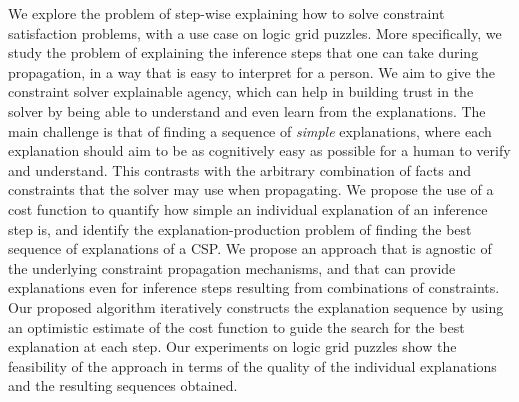 We explore the problem of step-wise explaining how to solve constraint satisfaction problems, with a use case on logic grid puzzles. More specifically, we study the problem of explaining the inference steps that one can take during propagation, in a way that is easy to interpret for a person. We aim to give the constraint solver explainable agency, which can help in building trust in the solver by being able to understand and even learn from the explanations.
The main challenge is that of finding a sequence of \textit{simple} explanations, where each explanation should aim to be as cognitively easy as possible for a human to verify and understand. 
This contrasts with the arbitrary combination of facts and constraints that the solver may use when propagating. %
We propose the use of a cost function to quantify how simple an individual explanation of an inference step is, and identify the explanation-production problem of finding the best sequence of explanations of a CSP. 
We propose an approach that is agnostic of the underlying constraint propagation mechanisms, and that can provide explanations even for inference steps resulting from combinations of constraints.
Our proposed algorithm iteratively constructs the explanation sequence by using an optimistic estimate of the cost function to guide the search for the best explanation at each step.
Our experiments on logic grid puzzles show the feasibility of the approach in terms of the quality of the individual explanations and the resulting sequences obtained.
